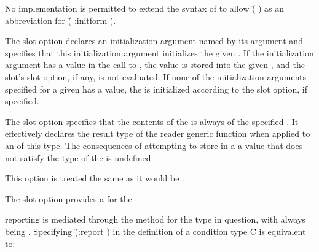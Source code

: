 No implementation is permitted to extend the syntax of 
to allow \f{( )} as an abbreviation for
\f{( :initform )}.
 

The  slot option declares an initialization
argument named by its  argument
and specifies that this
initialization argument initializes the given .  If the
initialization argument has a value in the call to 
, the value is stored into the given ,
and the slot's  slot option, if any, is not
evaluated.  If none of the initialization arguments specified for a
given  has a value, the  is initialized according to the
 slot option, if specified.  
 

The  slot option specifies that the contents of the
 is always of the specified .  It effectively
declares the result type of the reader generic function when applied
to an  of this  type.  
The consequences of attempting to store in a
 a value that 
does not satisfy the type of the  is undefined.
 


This option is treated the same as it would be .



The  slot option provides a 
for the .



 reporting is mediated through the 
method for the  type in question, with 
always being \nil. Specifying \f{(:report )} 
in the definition of a condition type \f{C} is equivalent to:

